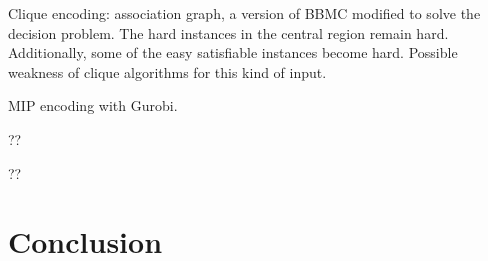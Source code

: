 \documentclass[letterpaper]{article}
\begin{document}
Clique encoding: association graph, a version of BBMC modified to solve the decision problem. The
hard instances in the central region remain hard. Additionally, some of the easy satisfiable
instances become hard. Possible weakness of clique algorithms for this kind of input.

MIP encoding with Gurobi.

?? \citep{Anton:2009}

?? \citep{Lipets:2009}

\section{Conclusion}

\lipsum[11]

\lipsum[12]



\end{document}
